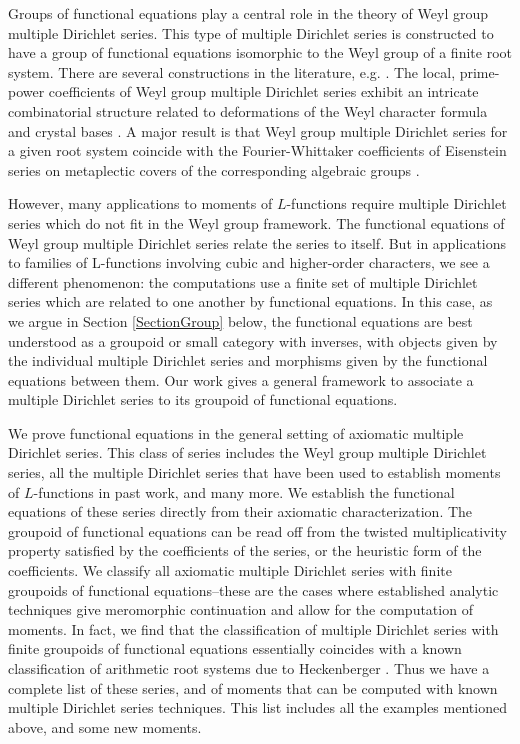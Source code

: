 \documentclass[11pt,letterpaper]{article}
\theoremstyle{definition}
\theoremstyle{remark}
\numberwithin{equation}{section}
\theoremstyle{dotless}
\begin{document}
Groups of functional equations play a central role in the theory of Weyl group multiple Dirichlet series. This type of multiple Dirichlet series is constructed to have a group of functional equations isomorphic to the Weyl group of a finite root system. There are several constructions in the literature, e.g. \cite{BrubakerBumpFriedberg, ChintaGunnellsJAMS}. The local, prime-power coefficients of Weyl group multiple Dirichlet series exhibit an intricate combinatorial structure related to deformations of the Weyl character formula \cite{ChintaOffen} and crystal bases \cite{BrubakerBumpFriedberg2}. A major result is that Weyl group multiple Dirichlet series for a given root system coincide with the Fourier-Whittaker coefficients of Eisenstein series on metaplectic covers of the corresponding algebraic groups \cite{McNamara, PatnaikPuskas, Chen}. 

However, many applications to moments of $L$-functions require multiple Dirichlet series which do not fit in the Weyl group framework. The functional equations of Weyl group multiple Dirichlet series relate the series to itself. But in applications to families of L-functions involving cubic and higher-order characters, we see a different phenomenon: the computations use a finite set of multiple Dirichlet series which are related to one another by functional equations. In this case, as we argue in Section \ref{SectionGroup} below, the functional equations are best understood as a groupoid or small category with inverses, with objects given by the individual multiple Dirichlet series and morphisms given by the functional equations between them. Our work gives a general framework to associate a multiple Dirichlet series to its groupoid of functional equations. 

We prove functional equations in the general setting of axiomatic multiple Dirichlet series. This class of series includes the Weyl group multiple Dirichlet series, all the multiple Dirichlet series that have been used to establish moments of $L$-functions in past work, and many more. We establish the functional equations of these series directly from their axiomatic characterization. The groupoid of functional equations can be read off from the twisted multiplicativity property satisfied by the coefficients of the series, or the heuristic form of the coefficients. We classify all axiomatic multiple Dirichlet series with finite groupoids of functional equations--these are the cases where established analytic techniques give meromorphic continuation and allow for the computation of moments. In fact, we find that the classification of multiple Dirichlet series with finite groupoids of functional equations essentially coincides with a known classification of arithmetic root systems due to Heckenberger \cite{HeckenbergerClassification}. Thus we have a complete list of these series, and of moments that can be computed with known multiple Dirichlet series techniques. This list includes all the examples mentioned above, and some new moments. 
\end{document}

